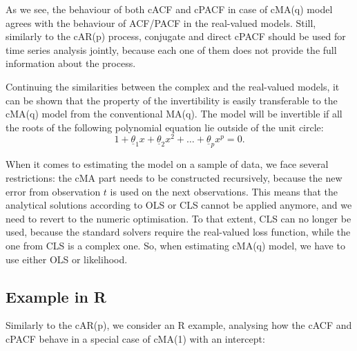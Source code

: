 \documentclass[
]{book}
\begin{document}
As we see, the behaviour of both cACF and cPACF in case of cMA(q) model agrees with the behaviour of ACF/PACF in the real-valued models. Still, similarly to the cAR(p) process, conjugate and direct cPACF should be used for time series analysis jointly, because each one of them does not provide the full information about the process.

Continuing the similarities between the complex and the real-valued models, it can be shown that the property of the invertibility is easily transferable to the cMA(q) model from the conventional MA(q). The model will be invertible if all the roots of the following polynomial equation lie outside of the unit circle:
\begin{equation}
    1 + \underline{\theta}_1 x + \underline{\theta}_2 x^2 + \dots + \underline{\theta}_p x^p = 0 .
    \label{eq:ComplexMAPolyRoots}
\end{equation}

When it comes to estimating the model on a sample of data, we face several restrictions: the cMA part needs to be constructed recursively, because the new error from observation \(t\) is used on the next observations. This means that the analytical solutions according to OLS or CLS cannot be applied anymore, and we need to revert to the numeric optimisation. To that extent, CLS can no longer be used, because the standard solvers require the real-valued loss function, while the one from CLS is a complex one. So, when estimating cMA(q) model, we have to use either OLS or likelihood.

\hypertarget{example-in-r-2}{%
\subsection{Example in R}\label{example-in-r-2}}

Similarly to the cAR(p), we consider an R example, analysing how the cACF and cPACF behave in a special case of cMA(1) with an intercept:
\end{document}
